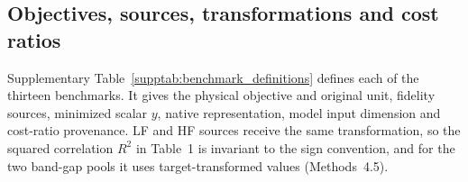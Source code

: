 
\subsection{Objectives, sources, transformations and cost ratios}
Supplementary Table~\ref{supptab:benchmark_definitions} defines each of the thirteen benchmarks. It gives the physical objective and original unit, fidelity sources, minimized scalar $y$, native representation, model input dimension and cost-ratio provenance. LF and HF sources receive the same transformation, so the squared correlation $R^2$ in Table~1 is invariant to the sign convention, and for the two band-gap pools it uses target-transformed values (Methods~4.5).

